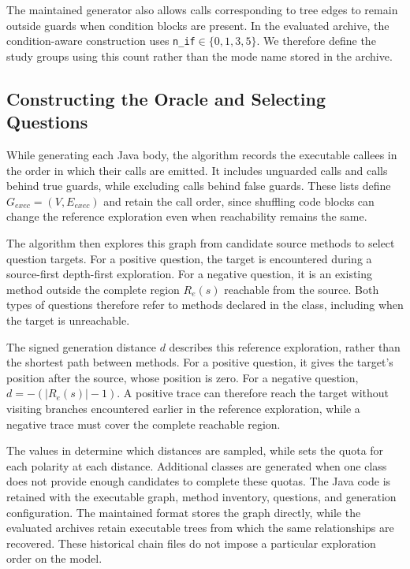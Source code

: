 The maintained generator also allows calls corresponding to tree edges to remain outside guards when condition blocks are present. In the evaluated archive, the condition-aware construction uses \mbox{\texttt{n\_if}}$\in\{0,1,3,5\}$. We therefore define the study groups using this count rather than the mode name stored in the archive.

\subsection{Constructing the Oracle and Selecting Questions}

While generating each Java body, the algorithm records the executable callees in the order in which their calls are emitted. It includes unguarded calls and calls behind true guards, while excluding calls behind false guards. These lists define $G_{\mathit{exec}}=(V,E_{\mathit{exec}})$ and retain the call order, since shuffling code blocks can change the reference exploration even when reachability remains the same.

The algorithm then explores this graph from candidate source methods to select question targets. For a positive question, the target is encountered during a source-first depth-first exploration. For a negative question, it is an existing method outside the complete region $R_e(s)$ reachable from the source. Both types of questions therefore refer to methods declared in the class, including when the target is unreachable.

The signed generation distance $d$ describes this reference exploration, rather than the shortest path between methods. For a positive question, it gives the target's position after the source, whose position is zero. For a negative question, $d=-(|R_e(s)|-1)$. A positive trace can therefore reach the target without visiting branches encountered earlier in the reference exploration, while a negative trace must cover the complete reachable region.

The values in  determine which distances are sampled, while  sets the quota for each polarity at each distance. Additional classes are generated when one class does not provide enough candidates to complete these quotas. The Java code is retained with the executable graph, method inventory, questions, and generation configuration. The maintained format stores the graph directly, while the evaluated archives retain executable trees from which the same relationships are recovered. These historical chain files do not impose a particular exploration order on the model.

